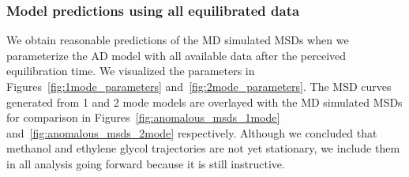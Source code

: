\documentclass{article}
\begin{document}
 
  
  \subsubsection{Model predictions using all equilibrated data}\label{section:AD_all_data}
  
  We obtain reasonable predictions of the MD simulated MSDs when we parameterize the
  AD model with all available data after the perceived equilibration time. We visualized the
  parameters in Figures~\ref{fig:1mode_parameters} and~\ref{fig:2mode_parameters}.
  The MSD curves generated from 1 and 2 mode models are overlayed with the MD simulated MSDs for 
  comparison in Figures~\ref{fig:anomalous_msds_1mode} and~\ref{fig:anomalous_msds_2mode}
  respectively. Although we concluded that methanol and ethylene glycol trajectories are
  not yet stationary, we include them in all analysis going forward because it is still
  instructive.
  
\end{document}
